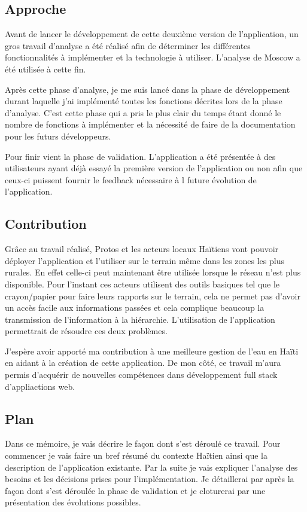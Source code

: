 \documentclass{EPL-master-thesis-covers-FR}
\begin{document}
			
		\subsection*{Approche}
			Avant de lancer le développement de cette deuxième version de l'application, un gros travail d'analyse a été réalisé afin de déterminer les différentes fonctionnalités à implémenter et la technologie à utiliser. L'analyse de Moscow \cite{ref:moscow} a été utilisée à cette fin.
		
			Après cette phase d'analyse, je me suis lancé dans la phase de développement durant laquelle j'ai implémenté toutes les fonctions décrites lors de la phase d'analyse. C'est cette phase qui a pris le plus clair du temps étant donné le nombre de fonctions à implémenter et la nécessité de faire de la documentation pour les futurs développeurs.
			
			Pour finir vient la phase de validation. L'application a été présentée à des utilisateurs ayant déjà essayé la première version de l'application ou non afin que ceux-ci puissent fournir le feedback nécessaire à l	 future évolution de l'application.
			
		\subsection*{Contribution}
			Grâce au travail réalisé, Protos et les acteurs locaux Haïtiens vont pouvoir déployer l'application et l'utiliser sur le terrain même dans les zones les plus rurales. En effet celle-ci peut maintenant être utilisée lorsque le réseau n'est plus disponible. Pour l'instant ces acteurs utilisent des outils basiques tel que le crayon/papier pour faire leurs rapports sur le terrain, cela ne permet pas d'avoir un accès facile aux informations passées et cela complique beaucoup la transmission de l'information à la hiérarchie. L'utilisation de l'application permettrait de résoudre ces deux problèmes.
			
			J'espère avoir apporté ma contribution à une meilleure gestion de l'eau en Haïti en aidant à la création de cette application. De mon côté, ce travail m'aura permis d'acquérir de nouvelles compétences dans développement full stack d'appliactions web.

		\subsection*{Plan}
			Dans ce mémoire, je vais décrire le façon dont s'est déroulé ce travail. Pour commencer je vais faire un bref résumé du contexte Haïtien ainsi que la description de l'application existante. Par la suite je vais expliquer l'analyse des besoins et les décisions prises pour l'implémentation. Je détaillerai par après la façon dont s'est déroulée la phase de validation et je cloturerai par une présentation des évolutions possibles.
		
\end{document}
